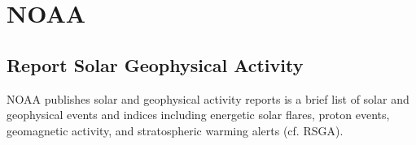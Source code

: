 \documentclass[dec_sum_main.tex]{subfiles}
\begin{document}
\pagebreak

\section{NOAA}

\subsection{Report Solar Geophysical Activity}
NOAA publishes solar and geophysical activity reports is a brief list of solar and geophysical events and indices including energetic solar flares, proton events, geomagnetic activity, and stratospheric warming alerts (cf. RSGA). \newline

	
	 \newline
	
\end{document}
